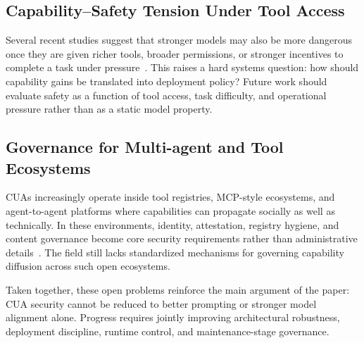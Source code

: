 \subsection{Capability--Safety Tension Under Tool Access}
Several recent studies suggest that stronger models may also be more dangerous once they are given richer tools, broader permissions, or stronger incentives to complete a task under pressure~\cite{tian2025measuring,sehwag2025propensitybench}. This raises a hard systems question: how should capability gains be translated into deployment policy? Future work should evaluate safety as a function of tool access, task difficulty, and operational pressure rather than as a static model property.

\subsection{Governance for Multi-agent and Tool Ecosystems}
CUAs increasingly operate inside tool registries, MCP-style ecosystems, and agent-to-agent platforms where capabilities can propagate socially as well as technically. In these environments, identity, attestation, registry hygiene, and content governance become core security requirements rather than administrative details~\cite{lee2024prompt,zhang2025mcp,wang2026asset,liu2026clawkeeper}. The field still lacks standardized mechanisms for governing capability diffusion across such open ecosystems.

Taken together, these open problems reinforce the main argument of the paper: CUA security cannot be reduced to better prompting or stronger model alignment alone. Progress requires jointly improving architectural robustness, deployment discipline, runtime control, and maintenance-stage governance.

